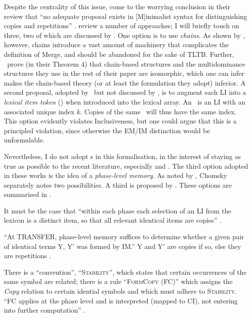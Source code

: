 Despite the centrality of this issue, \textcite{CollinsC.GroatEM_2018} come to the worrying conclusion in their review that ``no adequate proposal exists in [M]inimalist syntax for distinguishing copies and repetitions'' \parencite[2]{CollinsC.GroatEM_2018}. \textcite{CollinsC.GroatEM_2018} review a number of approaches; I will briefly touch on three, two of which are discussed by \textcite{CollinsC.GroatEM_2018}. One option is to use \textit{chains}. As shown by \CS, however, chains introduce a vast amount of machinery that complicates the definition of Merge, and should be abandoned for the sake of TLTB. Further, \CS\ prove (in their Theorem 4) that chain-based structures and the multidominance structures they use in the rest of their paper are isomorphic, which one can infer makes the chain-based theory (or at least the formulation they adopt) inferior. A second proposal, adopted by \CS\ but not discussed by \textcite{CollinsC.GroatEM_2018}, is to augment each LI into a \textit{lexical item token} (\LIk) when introduced into the lexical array. An \LIk\ is an LI with an associated unique index $k$. Copies of the same \LIk\ will thus have the same index. This option evidently violates Inclusiveness, but one could argue that this is a principled violation, since otherwise the EM/IM distinction would be unformulable.

Nevertheless, I do not adopt \LIk s in this formalisation, in the interest of staying as true as possible to the recent literature, especially \textcite{ChomskyN.etal_2019} and \textcite{ChomskyN_2021}. The third option adopted in these works is the idea of a \textit{phase-level memory}. As noted by \textcite[12]{CollinsC.GroatEM_2018}, Chomsky separately notes two possibilities. A third is proposed by \textcite{ChomskyN_2021}. These options are summarised in .

\begin{subexamples}[preamble={\textit{How could phase-level memory distinguish copies and repetitions?}}]\label{ex:phasemem}
    \item\label{ex:phasemem:1} It must be the case that ``within each phase each selection of an LI from the lexicon is a distinct item, so that all relevant identical items are copies'' \parencite[145]{ChomskyN_2008}.
    \item\label{ex:phasemem:2} ``At TRANSFER, phase-level memory suffices to determine whether a given pair of identical terms Y, Y$'$ was formed by IM.'' Y and Y$'$ are copies if so, else they are repetitions \parencite[246-247]{ChomskyN.etal_2019}.
    \item\label{ex:phasemem:3} There is a ``convention'', ``\textsc{Stability}'', which states that certain occurrences of the same symbol are related; there is a rule ``\textsc{FormCopy} (FC)'' which assigns the \textit{Copy} relation to certain idential symbols and which must adhere to \textsc{Stability}. ``FC applies at the phase level and is interpreted (mapped to CI), not entering into further computation'' \parencite[16-17]{ChomskyN_2021}.
\end{subexamples}


